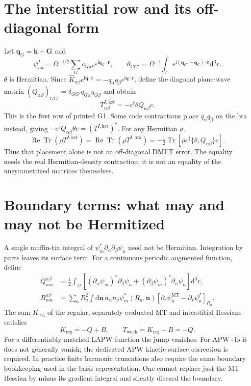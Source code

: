 \documentclass[11pt]{article}
\newcommand{\Tr}{\operatorname{Tr}}
\newcommand{\Rea}{\operatorname{Re}}
\newcommand{\dd}{\mathrm d}
\newcommand{\ii}{\mathrm i}
\newcommand{\MT}{\mathrm{MT}}
\begin{document}
\section{The interstitial row and its off-diagonal form}
Let $\bm q_G=\bm k+\bm G$ and
\begin{equation}
 \psi_{nk}^{I}=\Omega^{-1/2}\sum_Gc_{Gn k}e^{\ii\bm q_G\cdot\bm r},\qquad
 \theta_{GG'}=\Omega^{-1}\int_I e^{\ii(\bm q_{G'}-\bm q_G)\cdot\bm r}\dd^3r.
\end{equation}
$\theta$ is Hermitian. Since $\hat K_{\alpha\beta}e^{\ii\bm q\cdot\bm r}=-q_\alpha q_\beta e^{\ii\bm q\cdot\bm r}$, define the diagonal plane-wave matrix $(Q_{\alpha\beta})_{GG'}=\delta_{GG'}q_{G\alpha}q_{G\beta}$ and obtain
\begin{equation}\label{eq:interstitial}
 T^{I,\mathrm{ket}}_{\alpha\beta}=-c^\dagger\theta Q_{\alpha\beta}c.
\end{equation}
This is the first row of printed G1. Some code contractions place $q_\alpha q_\beta$ on the bra instead, giving $-c^\dagger Q_{\alpha\beta}\theta c=(T^{I,\mathrm{ket}})^\dagger$. For any Hermitian $\rho$,
\begin{equation}
 \Rea\Tr(\rho T^{I,\mathrm{ket}})=\Rea\Tr(\rho T^{I,\mathrm{bra}})
 =-\tfrac12\Tr[\rho c^\dagger\{\theta,Q_{\alpha\beta}\}c].
\end{equation}
Thus that placement alone is not an off-diagonal DMFT error. The equality needs the real Hermitian-density contraction; it is not an equality of the unsymmetrized matrices themselves.

\section{Boundary terms: what may and may not be Hermitized}
A single muffin-tin integral of $\psi_m^*\partial_\alpha\partial_\beta\psi_n$ need not be Hermitian. Integration by parts leaves its surface term. For a continuous periodic augmented function, define
\begin{align}
 Q^{\alpha\beta}_{mn}&=\tfrac12\int_\Omega[(\partial_\alpha\psi_m)^*\partial_\beta\psi_n
 +(\partial_\beta\psi_m)^*\partial_\alpha\psi_n]\dd^3r,\\
 B^{\alpha\beta}_{mn}&=\sum_a R_a^2\int\dd\bm n\,n_\alpha n_\beta\psi_m^*(R_a,\bm n)
 [\partial_r\psi_n^{\MT}-\partial_r\psi_n^I]_{R_a}.
\end{align}
The sum $K_{\mathrm{reg}}$ of the regular, separately evaluated MT and interstitial Hessians satisfies
\begin{equation}
 K_{\mathrm{reg}}=-Q+B,\qquad T_{\mathrm{weak}}=K_{\mathrm{reg}}-B=-Q.
\end{equation}
For a differentiably matched LAPW function the jump vanishes. For APW+lo it does not generally vanish; the dedicated APW kinetic surface correction is required. In practice finite harmonic truncations also require the same boundary bookkeeping used in the basis representation. One cannot replace just the MT Hessian by minus its gradient integral and silently discard the boundary.
\end{document}
